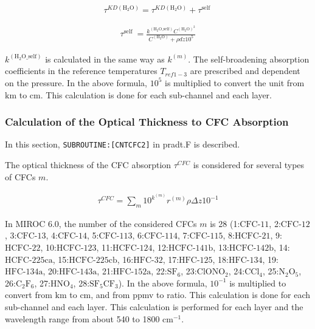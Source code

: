 \begin{eqnarray}
\tau^{K D\left(\mathrm{H_2O}\right)}=\tau^{K D\left(\mathrm{H_2O}\right)}+\tau^{\text {self }}
\end{eqnarray}

\begin{eqnarray}
\tau^{\text {self }}=\frac{k^{\left(\mathrm{H_2O\_self}\right)} C^{\left(\mathrm{H_2O}\right)^{2}}}{C^{\left(\mathrm{H_2O}\right)}+\rho d z 10^{5}}
\end{eqnarray}

\(k^{(\mathrm{H_2O\_self})}\) is calculated in the same way as
\(k^{(m)}\). The self-broadening absorption coefficients in the
reference temperatures \(T_{ref1-3}\) are prescribed and dependent on
the pressure. In the above formula, \(10^{5}\) is multiplied to convert
the unit from \(\mathrm{km}\) to \(\mathrm{cm}\). This calculation is
done for each sub-channel and each layer.

\hypertarget{calculation-of-the-optical-thickness-to-cfc-absorption}{%
\subsubsection{Calculation of the Optical Thickness to CFC
Absorption}\label{calculation-of-the-optical-thickness-to-cfc-absorption}}

In this section, \texttt{SUBROUTINE:{[}CNTCFC2{]}} in pradt.F is
described.

The optical thickness of the CFC absorption \(\tau^{CFC}\) is considered
for several types of CFCs \(m\).

\begin{eqnarray}
\tau^{C F C}=\sum_{m} 10^{k^{(m)}} r^{(m)} \rho \Delta z 10^{-1}
\end{eqnarray}

In MIROC 6.0, the number of the considered CFCs \(m\) is 28
(1:\(\mathrm{CFC\text{-11}}\), 2:\(\mathrm{CFC\text{-12}}\),
3:\(\mathrm{CFC\text{-13}}\), 4:\(\mathrm{CFC\text{-14}}\),
5:\(\mathrm{CFC\text{-113}}\), 6:\(\mathrm{CFC\text{-114}}\),
7:\(\mathrm{CFC\text{-115}}\), 8:\(\mathrm{HCFC\text{-21}}\),
9:\(\mathrm{HCFC\text{-22}}\), 10:\(\mathrm{HCFC\text{-123}}\),
11:\(\mathrm{HCFC\text{-124}}\), 12:\(\mathrm{HCFC\text{-141b}}\),
13:\(\mathrm{HCFC\text{-142b}}\), 14:\(\mathrm{HCFC\text{-225ca}}\),
15:\(\mathrm{HCFC\text{-225cb}}\), 16:\(\mathrm{HFC\text{-32}}\),
17:\(\mathrm{HFC\text{-125}}\), 18:\(\mathrm{HFC\text{-134}}\),
19:\(\mathrm{HFC\text{-134a}}\), 20:\(\mathrm{HFC\text{-143a}}\),
21:\(\mathrm{HFC\text{-152a}}\), 22:\(\mathrm{SF_6}\),
23:\(\mathrm{ClONO_2}\), 24:\(\mathrm{CCl_4}\), 25:\(\mathrm{N_2O_5}\),
26:\(\mathrm{C_2F_6}\), 27:\(\mathrm{HNO_4}\),
28:\(\mathrm{SF_5CF_3}\)). In the above formula, \(10^{-1}\) is
multiplied to convert from \(\mathrm{km}\) to \(\mathrm{cm}\), and from
ppmv to ratio. This calculation is done for each sub-channel and each
layer. This calculation is performed for each layer and the wavelength
range from about 540 to 1800 \(\mathrm{cm}^{-1}\).

